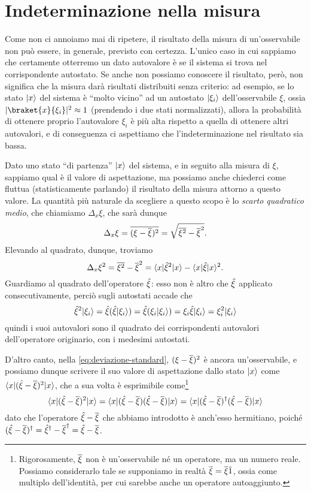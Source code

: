 \section{Indeterminazione nella misura}
Come non ci annoiamo mai di ripetere, il risultato della misura di un'osservabile non può essere, in generale, previsto con certezza.
L'unico caso in cui sappiamo che certamente otterremo un dato autovalore è se il sistema si trova nel corrispondente autostato.
Se anche non possiamo conoscere il risultato, però, non significa che la misura darà risultati distribuiti senza criterio: ad esempio, se lo stato $\lvert x\rangle$ del sistema è ``molto vicino'' ad un autostato $\lvert\xi_i\rangle$ dell'osservabile $\xi$, ossia $\abs{\braket{x}{\xi_i}}^2\approx 1$ (prendendo i due stati normalizzati), allora la probabilità di ottenere proprio l'autovalore $\xi_i$ è più alta rispetto a quella di ottenere altri autovalori, e di conseguenza ci aspettiamo che l'indeterminazione nel risultato sia bassa.

Dato uno stato ``di partenza'' $\lvert x\rangle$ del sistema, e in seguito alla misura di $\xi$, sappiamo qual è il valore di aspettazione, ma possiamo anche chiederci come fluttua (statisticamente parlando) il risultato della misura attorno a questo valore.
La quantità più naturale da scegliere a questo scopo è lo \emph{scarto quadratico medio}, che chiamiamo $\Delta_x\xi$, che sarà dunque
\begin{equation}
	\Delta_x\xi=\overline{(\xi-\overline{\xi})^2}=\sqrt{\overline{\xi^2}-\overline{\xi}^2}.
	\label{eq:deviazione-standard}
\end{equation}
Elevando al quadrato, dunque, troviamo
\begin{equation}
	\Delta_x\xi^2=\overline{\xi^2}-\overline{\xi}^2=\langle x\rvert\hat{\xi}^2\lvert x\rangle-\langle x\rvert\hat{\xi}\lvert x\rangle^2.
	\label{eq:varianza}
\end{equation}
Guardiamo al quadrato dell'operatore $\hat{\xi}$: esso non è altro che $\hat{\xi}$ applicato consecutivamente, perciò sugli autostati accade che
\begin{equation}
	\hat{\xi}^2\lvert\xi_i\rangle=\hat{\xi}(\hat{\xi}\lvert\xi_i\rangle)=\hat{\xi}(\xi_i\lvert\xi_i\rangle)=\xi_i\hat{\xi}\lvert\xi_i\rangle=\xi_i^2\lvert\xi_i\rangle
\end{equation}
quindi i suoi autovalori sono il quadrato dei corrispondenti autovalori dell'operatore originario, con i medesimi autostati.

D'altro canto, nella \eqref{eq:deviazione-standard}, $(\xi-\overline{\xi})^2$ è ancora un'osservabile, e possiamo dunque scrivere il suo valore di aspettazione dallo stato $\lvert x\rangle$ come $\langle x\rvert(\hat{\xi}-\overline{\xi})^2\lvert x\rangle$, che a sua volta è esprimibile come\footnote{Rigorosamente, $\overline{\xi}$ non è un'osservabile n\'e un operatore, ma un numero reale. Possiamo considerarlo tale se supponiamo in realtà $\overline{\xi}=\overline{\xi}\hat{1}$, ossia come multiplo dell'identità, per cui sarebbe anche un operatore autoaggiunto.}
\begin{equation}
	\langle x\rvert(\hat{\xi}-\overline{\xi})^2\lvert x\rangle=\langle x\rvert(\hat{\xi}-\overline{\xi})(\hat{\xi}-\overline{\xi})\lvert x\rangle=\langle x\rvert(\hat{\xi}-\overline{\xi})^\dagger(\hat{\xi}-\overline{\xi})\lvert x\rangle
\end{equation}
dato che l'operatore $\hat{\xi}-\overline{\xi}$ che abbiamo introdotto è anch'esso hermitiano, poich\'e $(\hat{\xi}-\overline{\xi})^\dagger=\hat{\xi}^\dagger-\overline{\xi}^\dagger=\hat{\xi}-\overline{\xi}$.

